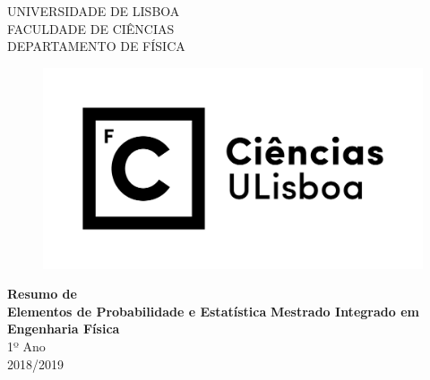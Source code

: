 \begin{titlepage}
    \centering
    \Large UNIVERSIDADE DE LISBOA\\
    \Large FACULDADE DE CIÊNCIAS\\
    \Large DEPARTAMENTO DE FÍSICA\\
    \vfill
    \begin{figure}[ht!]
        \centering
        \includegraphics[scale=0.5]{../Images/fcul.png}
    \end{figure}
    \vfill
    \textbf{\LARGE Resumo de\\Elementos de Probabilidade e Estatística}
    \vfill
    \vfill
    \textbf{\Large Mestrado Integrado em Engenharia Física}\\
    \vspace{0.5cm}
    \Large 1º Ano\\
    \vspace{0.5cm}
    \vfill
    \vfill
    \Large 2018/2019
\end{titlepage}